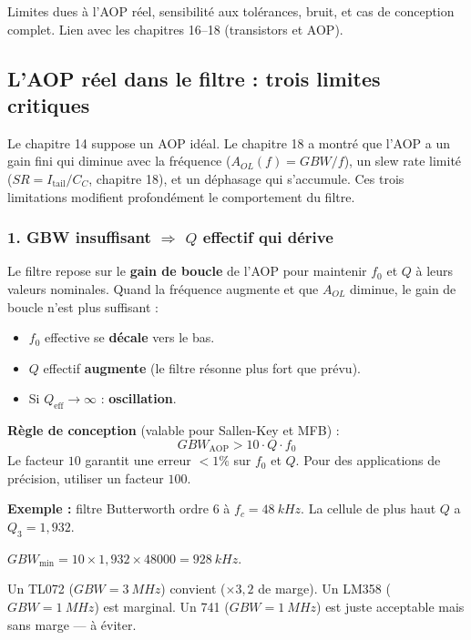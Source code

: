 \documentclass[12pt,a4paper,twoside]{book}
\begin{document}
\begin{ingenieur}
Limites dues à l'AOP réel, sensibilité aux tolérances, bruit, et cas de conception complet. Lien avec les chapitres 16--18 (transistors et AOP).
\end{ingenieur}

\subsection{L'AOP réel dans le filtre : trois limites critiques}

Le chapitre 14 suppose un AOP idéal. Le chapitre 18 a montré que l'AOP a un gain fini qui diminue avec la fréquence ($A_{OL}(f) = GBW/f$), un slew rate limité ($SR = I_{\text{tail}}/C_C$, chapitre 18), et un déphasage qui s'accumule. Ces trois limitations modifient profondément le comportement du filtre.

\subsubsection*{1. GBW insuffisant $\Rightarrow$ $Q$ effectif qui dérive}

\begin{formule}
Le filtre repose sur le \textbf{gain de boucle} de l'AOP pour maintenir $f_0$ et $Q$ à leurs valeurs nominales. Quand la fréquence augmente et que $A_{OL}$ diminue, le gain de boucle n'est plus suffisant :
\begin{itemize}[nosep]
\item $f_0$ effective se \textbf{décale} vers le bas.
\item $Q$ effectif \textbf{augmente} (le filtre résonne plus fort que prévu).
\item Si $Q_{\text{eff}} \to \infty$ : \textbf{oscillation}.
\end{itemize}

\textbf{Règle de conception} (valable pour Sallen-Key et MFB) :
\[
\boxed{GBW_{\text{AOP}} > 10 \cdot Q \cdot f_0}
\]
Le facteur $10$ garantit une erreur $< 1\%$ sur $f_0$ et $Q$. Pour des applications de précision, utiliser un facteur $100$.
\end{formule}

\begin{pratique}
\textbf{Exemple :} filtre Butterworth ordre 6 à $f_c = \SI{48}{kHz}$. La cellule de plus haut $Q$ a $Q_3 = 1{,}932$.

$GBW_{\min} = 10\times1{,}932\times48000 = \SI{928}{kHz}$.

Un TL072 ($GBW = \SI{3}{MHz}$) convient ($\times 3{,}2$ de marge). Un LM358 ($GBW = \SI{1}{MHz}$) est marginal. Un 741 ($GBW = \SI{1}{MHz}$) est juste acceptable mais sans marge --- à éviter.
\end{pratique}
\end{document}
